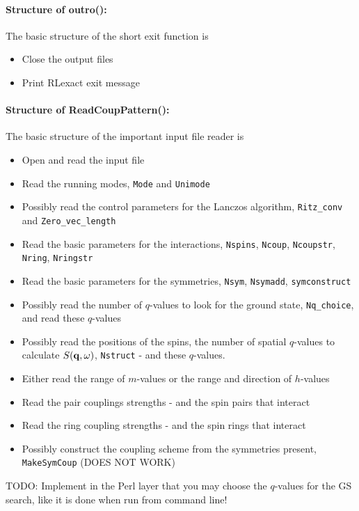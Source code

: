 \documentclass{article}
\begin{document}
\paragraph{Structure of outro():} The basic structure of the short exit function is 
\begin{itemize}
\item Close the output files
\item Print RLexact exit message
\end{itemize}

\paragraph{Structure of ReadCoupPattern():} The basic structure of the important input file reader is 
\begin{itemize}
\item Open and read the input file
\item Read the running modes, \verb+Mode+ and \verb+Unimode+
\item Possibly read the control parameters for the Lanczos algorithm, \verb+Ritz_conv+ and \verb+Zero_vec_length+
\item Read the basic parameters for the interactions, \verb+Nspins+, \verb+Ncoup+, \verb+Ncoupstr+, \verb+Nring+, \verb+Nringstr+
\item Read the basic parameters for the symmetries, \verb+Nsym+, \verb+Nsymadd+, \verb+symconstruct+
\item Possibly read the number of $q$-values to look for the ground state, \verb+Nq_choice+, and read these $q$-values 
\item Possibly read the positions of the spins, the number of spatial $q$-values to calculate $S({\bf q},\omega)$, \verb+Nstruct+ 
- and these $q$-values.
\item Either read the range of $m$-values or the range and direction of $h$-values
\item Read the pair couplings strengths - and the spin pairs that interact
\item Read the ring coupling strengths - and the spin rings that interact
\item Possibly construct the coupling scheme from the symmetries present, \verb+MakeSymCoup+ (DOES NOT WORK) 
\end{itemize}

TODO: Implement in the Perl layer that you may choose the $q$-values for the GS search, like it is done when run from command line!
\end{document}
